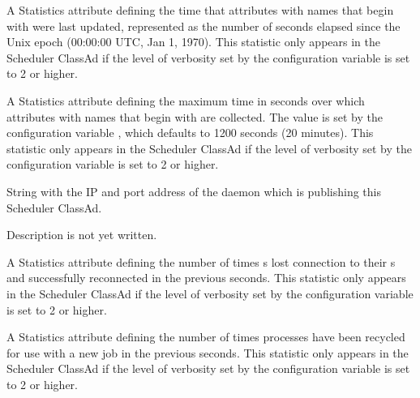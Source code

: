 \begin{description}
\item[\AdAttr{RecentStatsTickTime}:] A Statistics attribute defining
  the time that attributes with names that begin with  
  were last updated,
  represented as the number of seconds elapsed since
  the Unix epoch (00:00:00 UTC, Jan 1, 1970).
  This statistic only appears in the Scheduler ClassAd if the level of
  verbosity set by the configuration variable 
  is set to 2 or higher.

\item[\AdAttr{RecentWindowMax}:] A Statistics attribute defining
  the maximum time in seconds over which 
  attributes with names that begin with  are collected.
  The value is set by the configuration variable
  , which defaults to 1200 seconds
  (20 minutes). 
  This statistic only appears in the Scheduler ClassAd if the level of
  verbosity set by the configuration variable 
  is set to 2 or higher.

\item[\AdAttr{ScheddIpAddr}:] String with the IP and port address of the
 daemon which is publishing this Scheduler ClassAd.

\item[\AdAttr{ServerTime}:] Description is not yet written.

\item[\AdAttr{ShadowsReconnections}:] A Statistics attribute defining
  the number of times s lost 
  connection to their s and successfully reconnected
  in the previous  seconds.
  This statistic only appears in the Scheduler ClassAd if the level of
  verbosity set by the configuration variable 
  is set to 2 or higher.

\item[\AdAttr{ShadowsRecycled}:] A Statistics attribute defining
  the number of times  processes have been 
  recycled for use with a new job
  in the previous  seconds.
  This statistic only appears in the Scheduler ClassAd if the level of
  verbosity set by the configuration variable 
  is set to 2 or higher.


\end{description}
